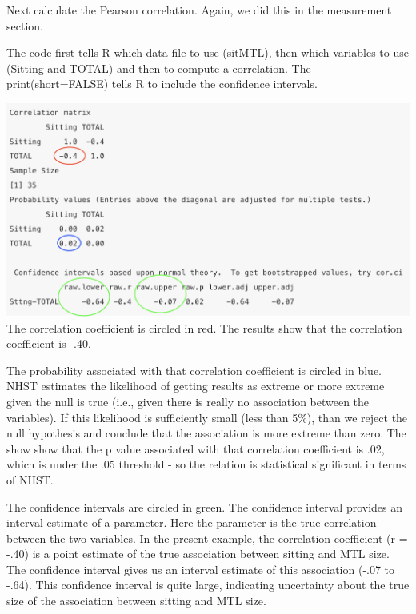 \documentclass[
]{book}
\newenvironment{Shaded}{\begin{snugshade}}{\end{snugshade}}
\newcommand{\DataTypeTok}[1]{\textcolor[rgb]{0.13,0.29,0.53}{#1}}
\newcommand{\KeywordTok}[1]{\textcolor[rgb]{0.13,0.29,0.53}{\textbf{#1}}}
\newcommand{\NormalTok}[1]{#1}
\newcommand{\OperatorTok}[1]{\textcolor[rgb]{0.81,0.36,0.00}{\textbf{#1}}}
\newcommand{\OtherTok}[1]{\textcolor[rgb]{0.56,0.35,0.01}{#1}}
\newcommand{\StringTok}[1]{\textcolor[rgb]{0.31,0.60,0.02}{#1}}
\begin{document}
Next calculate the Pearson correlation. Again, we did this in the measurement section.

The code first tells R which data file to use (sitMTL), then which variables to use (Sitting and TOTAL) and then to compute a correlation. The print(short=FALSE) tells R to include the confidence intervals.

\begin{Shaded}
\end{Shaded}

\includegraphics{img/corr.png}
The correlation coefficient is circled in red. The results show that the correlation coefficient is -.40.

The probability associated with that correlation coefficient is circled in blue. NHST estimates the likelihood of getting results as extreme or more extreme given the null is true (i.e., given there is really no association between the variables). If this likelihood is sufficiently small (less than 5\%), than we reject the null hypothesis and conclude that the association is more extreme than zero. The show show that the p value associated with that correlation coefficient is .02, which is under the .05 threshold - so the relation is statistical significant in terms of NHST.

The confidence intervals are circled in green. The confidence interval provides an interval estimate of a parameter. Here the parameter is the true correlation between the two variables. In the present example, the correlation coefficient (r = -.40) is a point estimate of the true association between sitting and MTL size. The confidence interval gives us an interval estimate of this association (-.07 to -.64). This confidence interval is quite large, indicating uncertainty about the true size of the association between sitting and MTL size.
\end{document}
